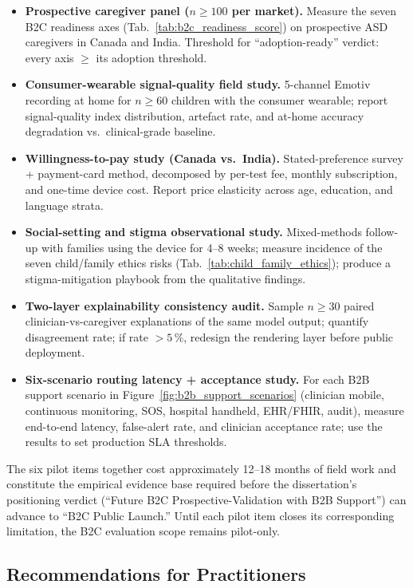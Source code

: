 \begin{itemize}[leftmargin=*, itemsep=2pt]
    \item \textbf{Prospective caregiver panel ($n \geq 100$ per market).} Measure the seven B2C readiness axes (Tab.~\ref{tab:b2c_readiness_score}) on prospective ASD caregivers in Canada and India. Threshold for ``adoption-ready'' verdict: every axis $\geq$ its adoption threshold.
    \item \textbf{Consumer-wearable signal-quality field study.} 5-channel Emotiv recording at home for $n \geq 60$ children with the consumer wearable; report signal-quality index distribution, artefact rate, and at-home accuracy degradation vs.\ clinical-grade baseline.
    \item \textbf{Willingness-to-pay study (Canada vs.\ India).} Stated-preference survey + payment-card method, decomposed by per-test fee, monthly subscription, and one-time device cost. Report price elasticity across age, education, and language strata.
    \item \textbf{Social-setting and stigma observational study.} Mixed-methods follow-up with families using the device for 4--8 weeks; measure incidence of the seven child/family ethics risks (Tab.~\ref{tab:child_family_ethics}); produce a stigma-mitigation playbook from the qualitative findings.
    \item \textbf{Two-layer explainability consistency audit.} Sample $n \geq 30$ paired clinician-vs-caregiver explanations of the same model output; quantify disagreement rate; if rate $> 5\,\%$, redesign the rendering layer before public deployment.
    \item \textbf{Six-scenario routing latency + acceptance study.} For each B2B support scenario in Figure~\ref{fig:b2b_support_scenarios} (clinician mobile, continuous monitoring, SOS, hospital handheld, EHR/FHIR, audit), measure end-to-end latency, false-alert rate, and clinician acceptance rate; use the results to set production SLA thresholds.
\end{itemize}

\noindent The six pilot items together cost approximately 12--18 months of field work and constitute the empirical evidence base required before the dissertation's positioning verdict (``Future B2C Prospective-Validation with B2B Support'') can advance to ``B2C Public Launch.'' Until each pilot item closes its corresponding limitation, the B2C evaluation scope remains pilot-only.

\subsection{Recommendations for Practitioners}

